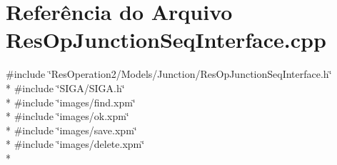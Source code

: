 \section{Referência do Arquivo Res\+Op\+Junction\+Seq\+Interface.\+cpp}
\label{_res_op_junction_seq_interface_8cpp}
{\ttfamily \#include \char`\"{}Res\+Operation2/\+Models/\+Junction/\+Res\+Op\+Junction\+Seq\+Interface.\+h\char`\"{}}\\*
{\ttfamily \#include \char`\"{}S\+I\+G\+A/\+S\+I\+G\+A.\+h\char`\"{}}\\*
{\ttfamily \#include \char`\"{}images/find.\+xpm\char`\"{}}\\*
{\ttfamily \#include \char`\"{}images/ok.\+xpm\char`\"{}}\\*
{\ttfamily \#include \char`\"{}images/save.\+xpm\char`\"{}}\\*
{\ttfamily \#include \char`\"{}images/delete.\+xpm\char`\"{}}\\*
